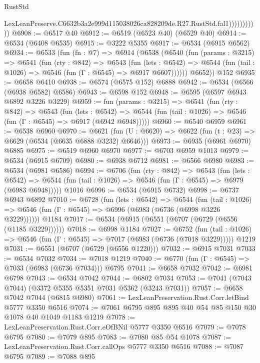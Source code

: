 \begin{lexlean}{RustStd}
\begin{coremodule}
                          LexLeanPreserve.C6632b3a2e999d115038026ca828209de.R27.RustStd.fal1)))))))))))
@6908 := @6517 @40
@6912 := @6519 (@6523 @40) (@6529 @40)
@6914 := @6534 (@6408 @6535)
@6915 := @3222 @5355
@6917 := @6534 (@6915 @6562)
@6934 := @6533
    (fun (fn : @7) =>
    @6914
      (@6538
        (@6540
          (fun (params : @3215) =>
          @6541
            (fun (rty : @842) =>
            @6543
              (fun (lets : @6542) =>
              @6544 (fun (tail : @1026) => @6546 (fun (Γ : @6545) => @6917 @6607))))))
        @6652))
    @152
@6935 := @6658 @6410
@6938 := @6574 (@6575 @152) @6888
@6942 := @6534 (@6566 (@6938 @6582) @6586)
@6943 := @6598 @152
@6948 := @6595 (@6597 @6943 @6892 @3226 @3229)
@6959 := fun (params : @3215) =>
  @6541
    (fun (rty : @842) =>
    @6543
      (fun (lets : @6542) =>
      @6544 (fun (tail : @1026) => @6546 (fun (Γ : @6545) => @6917 (@6942 @6948)))))
@6960 := @6540 @6959
@6961 := @6538 @6960
@6970 := @6621 (fun (U : @6620) => @6622 (fun (t : @23) => @6629 (@6534 (@6635 @6888 @3232) @6646)))
@6973 := @6935 (@6961 @6970) @6885
@6975 := @6519 @6960 @6970
@6977 := @6703 @6959 @1013
@6979 := @6534 (@6915 @6709)
@6980 := @6938 @6712
@6981 := @6566 @6980
@6983 := @6534 (@6981 @6586)
@6994 := @6706
    (fun (rty : @842) =>
    @6543
      (fun (lets : @6542) =>
      @6544 (fun (tail : @1026) => @6546 (fun (Γ : @6545) => @6979 (@6983 @6948)))))
    @1016
@6996 := @6534 (@6915 @6732)
@6998 := @6737 @6943 @6892
@7010 := @6728
    (fun (lets : @6542) =>
    @6544
      (fun (tail : @1026) => @6546 (fun (Γ : @6545) => @6996 (@6983 (@6736 (@6998 @3226 @3229))))))
    @1184
@7017 := @6534 (@6915 (@6551 (@6707 (@6729 (@6556 (@1185 @3229))))))
@7018 := @6998 @1184
@7027 := @6752
    (fun (tail : @1026) => @6546 (fun (Γ : @6545) => @7017 (@6983 (@6736 (@7018 @3229)))))
    @1219
@7031 := @6551 (@6707 (@6729 (@6556 @1220)))
@7032 := @6915 @7031
@7033 := @6534 @7032
@7034 := @7018 @1219
@7040 := @6770 (fun (Γ : @6545) => @7033 (@6983 (@6736 @7034))) @6795
@7041 := @6658 @7032
@7042 := @6981 @6798
@7043 := @6534 @7042
@7044 := @6802 @7034
@7053 := @7041 (@7043 @7044) (@3372 @5355 @5351 @7031 @5362 (@3243 @7031))
@7057 := @6658 @7042 @7044 (@6815 @6980)
@7061 := LexLeanPreservation.Rust.Corr.letBind @5777 @3350 @6516
@7074 := @7061 @6795 @895 @895 @40 @54 @85 @150 @30 @1078 @40 @1049 @1183 @1219
@7078 := LexLeanPreservation.Rust.Corr.eOfBNil @5777 @3350 @6516
@7079 := @7078 @6795
@7080 := @7079 @895
@7083 := @7080 @85 @54 @1078
@7087 := LexLeanPreservation.Rust.Corr.callOps @5777 @3350 @6516
@7088 := @7087 @6795
@7089 := @7088 @895

\end{coremodule}
\end{lexlean}
